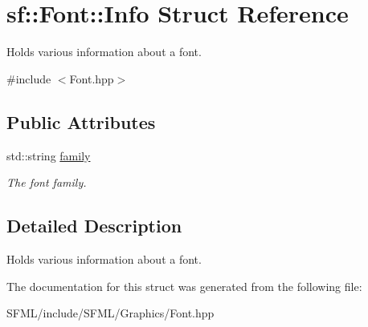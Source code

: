 \hypertarget{structsf_1_1_font_1_1_info}{}\section{sf\+:\+:Font\+:\+:Info Struct Reference}
\label{structsf_1_1_font_1_1_info}


Holds various information about a font.  




{\ttfamily \#include $<$Font.\+hpp$>$}

\subsection*{Public Attributes}
\begin{DoxyCompactItemize}
\item 
\mbox{\label{structsf_1_1_font_1_1_info_a008413b4b6cf621eb92668a11098a519}} 
std\+::string \mbox{\hyperlink{structsf_1_1_font_1_1_info_a008413b4b6cf621eb92668a11098a519}{family}}
\begin{DoxyCompactList}\small\item\em The font family. \end{DoxyCompactList}\end{DoxyCompactItemize}


\subsection{Detailed Description}
Holds various information about a font. 

\begin{DoxyVerb}\end{DoxyVerb}
 

The documentation for this struct was generated from the following file\+:\begin{DoxyCompactItemize}
\item 
S\+F\+M\+L/include/\+S\+F\+M\+L/\+Graphics/Font.\+hpp\end{DoxyCompactItemize}
